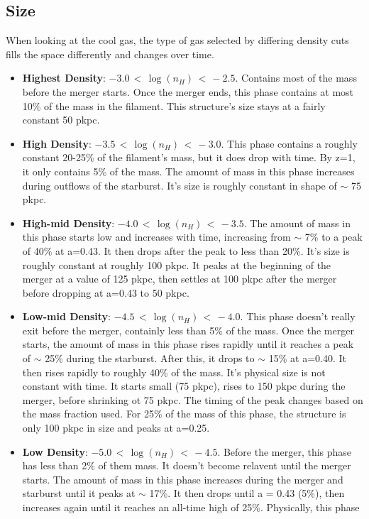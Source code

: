 \documentclass{article}
\begin{document}
\subsection{Size}
When looking at the cool gas, the type of gas selected by differing density cuts
fills the space differently and changes over time. 
\begin{itemize}
\item {\bf Highest Density}: $-3.0\,<\,\log(n_H)\,<\,-2.5$. Contains most of the
mass before the merger starts. Once the merger ends, this phase contains at most
10\% of the mass in the filament. This structure's size stays at a fairly
constant 50 pkpc. 
\item {\bf High Density}: $-3.5\,<\,\log(n_H)\,<\,-3.0$. This phase contains a
roughly constant 20-25\% of the filament's mass, but it does drop with time. By
z=1, it only contains 5\% of the mass. The amount of mass in this phase increases
during outflows of the starburst. It's size is roughly constant in shape of
$\sim$ 75 pkpc. 
\item {\bf High-mid Density}: $-4.0\,<\,\log(n_H)\,<\,-3.5$. The amount of mass
in this phase starts low and increases with time, increasing from $\sim$ 7\% to a
peak of 40\% at a=0.43. It then drops after the peak to less than 20\%. It's size
is roughly constant at roughly 100 pkpc. It peaks at the beginning of the merger
at a value of 125 pkpc, then settles at 100 pkpc after the merger before dropping
at a=0.43 to 50 pkpc. 
\item {\bf Low-mid Density}: $-4.5\,<\,\log(n_H)\,<\,-4.0$. This phase doesn't
really exit before the merger, containly less than 5\% of the mass. Once the
merger starts, the amount of mass in this phase rises rapidly until it reaches a
peak of $\sim$ 25\% during the starburst. After this, it drops to $\sim$ 15\% at
a=0.40. It then rises rapidly to roughly 40\% of the mass. It's physical size is
not constant with time. It starts small (75 pkpc), rises to 150 pkpc during the
merger, before shrinking ot 75 pkpc. The timing of the peak changes based on the
mass fraction used. For 25\% of the mass of this phase, the structure is only 100
pkpc in size and peaks at a=0.25. 
\item {\bf Low Density}: $-5.0\,<\,\log(n_H)\,<\,-4.5$. Before the merger, this
phase has less than 2\% of them mass. It doesn't become relavent until the merger
starts. The amount of mass in this phase increases during the merger and
starburst until it peaks at $\sim$ 17\%. It then drops until a = 0.43 (5\%), then
increases again until it reaches an all-time high of 25\%. Physically, this phase

\end{itemize}
\end{document}
